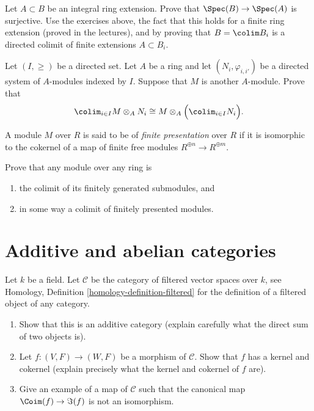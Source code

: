 \begin{exercise}
\label{exercise-integral-colimit-finite}
Let $A \subset B$ be an integral ring extension. Prove that
$\Spec(B) \to \Spec(A)$ is surjective.
Use the exercises above, the fact that this holds for a finite ring
extension (proved in the lectures), and by proving that
$B = \colim B_i$ is a directed colimit of finite extensions $A \subset B_i$.
\end{exercise}

\begin{exercise}
\label{exercise-colimit-tensor}
Let $(I, \geq)$ be a directed set.
Let $A$ be a ring and let $(N_i, \varphi_{i, i'})$ be a directed system of
$A$-modules indexed by $I$. Suppose that $M$ is another $A$-module. Prove
that
$$
\colim_{i\in I} M \otimes_A N_i\cong
M \otimes_A \Big( \colim_{i\in I} N_i\Big).
$$
\end{exercise}

\begin{definition}
\label{definition-finite-presentation}
A module $M$ over $R$ is said to be of {\it finite presentation} over
$R$ if it  is isomorphic to the cokernel of a map of finite free modules
$ R^{\oplus n} \to R^{\oplus m}$.
\end{definition}

\begin{exercise}
\label{exercise-colimit-modules}
Prove that any module over any ring is
\begin{enumerate}
\item the colimit of its finitely generated submodules, and
\item in some way a colimit of finitely presented modules.
\end{enumerate}
\end{exercise}





\section{Additive and abelian categories}
\label{section-additive}

\begin{exercise}
\label{exercise-filtered-vector-spaces}
Let $k$ be a field. Let $\mathcal{C}$ be the category of filtered vector
spaces over $k$, see
Homology, Definition \ref{homology-definition-filtered}
for the definition of a filtered object of any category.
\begin{enumerate}
\item Show that this is an additive category (explain carefully what the
direct sum of two objects is).
\item Let $f : (V, F) \to (W, F)$ be a morphism of $\mathcal{C}$.
Show that $f$ has a kernel and cokernel (explain precisely
what the kernel and cokernel of $f$ are).
\item Give an example of a map of $\mathcal{C}$ such that
the canonical map $\Coim(f) \to \Im(f)$ is not an isomorphism.
\end{enumerate}
\end{exercise}

